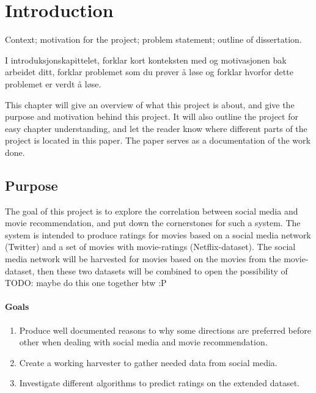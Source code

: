 
\chapter{Introduction}

\minitoc
\setcounter{page}{1}

Context;  motivation  for the project;  problem statement;  outline of dissertation.

I introduksjonskapittelet, forklar kort konteksten med og motivasjonen bak arbeidet ditt, forklar problemet som du prøver å løse og forklar hvorfor dette problemet er verdt å løse.

This chapter will give an overview of what this project is about, and give the purpose and motivation behind this project. It will also outline the project for easy chapter understanding, and let the reader know where different parts of the project is located in this paper. The paper serves as a documentation of the work done.

\clearpage


\section{Purpose}
The goal of this project is to explore the correlation between social media and movie recommendation, and put down the cornerstones for such a system. The system is intended to produce ratings for movies based on a social media network (Twitter) and a set of movies with movie-ratings (Netflix-dataset). The social media network will be harvested for movies based on the movies from the movie-dataset, then these two datasets will be combined to open the possibility of TODO: maybe do this one together btw :P

\subsubsection{Goals}
\begin{enumerate}
  \item Produce well documented reasons to why some directions are preferred before other when dealing with social media and movie recommendation.
  \item Create a working harvester to gather needed data from social media.
  \item Investigate different algorithms to predict ratings on the extended dataset.
\end{enumerate}

